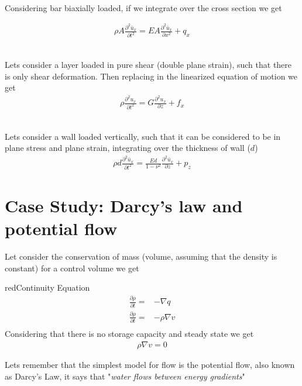 \documentclass[a4paper, 11pt,article,oneside]{memoir}%
\begin{document}
{}\\
Considering bar biaxially loaded, if we integrate over the cross section we get

\begin{gather*}
\rho A\frac{\partial^2\bar{u}_x}{\partial t^2}=EA\frac{\partial^2 \bar{u}_x}{\partial x^2}+q_x
\end{gather*}


{}\\
Lets consider a layer loaded in pure shear (double plane strain), such that there is only shear deformation.
Then replacing in the linearized equation of motion we get 
\begin{gather*}
\rho \frac{\partial^2 u_x}{\partial t^2}=G\frac{\partial^2 u_x}{\partial z}+f_x
\end{gather*}


{}\\
Lets consider a wall loaded vertically, such that it can be considered to be in plane stress and plane strain, integrating over the thickness of wall ($d$)
\begin{gather*}
\rho d \frac{\partial^2 \bar{u}_x}{\partial t^2}=\frac{Ed}{1-\nu^2}\frac{\partial^2 \bar{u}_x}{\partial z}+p_z
\end{gather*}

\section{Case Study: Darcy's law and potential flow}
Let consider the conservation of mass (volume, assuming that the density is constant) for a control volume we get  
\begin{eqbox2}{red}{Continuity Equation}
\begin{align*}
\frac{\partial \rho}{\partial t}=&-\nabla q\\
\frac{\partial \rho}{\partial t}=&-\rho \nabla v\\
\end{align*}
Considering that there is no storage capacity  and steady state we get
\begin{gather*}
\rho \nabla v=0
\end{gather*}
\end{eqbox2}

Lets remember that the simplest model for flow is the potential flow, also known as Darcy's Law, it says that "\textit{water flows between energy gradients}"
\end{document}
